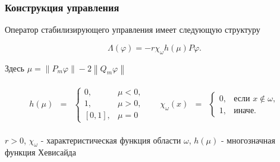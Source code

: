 \documentclass{beamer}
\newcommand{\norm}[1]{\left\lVert#1\right\rVert}
\begin{document}
\begin{frame}
    \frametitle{Конструкция управления}

    Оператор стабилизирующего управления имеет следующую структуру

    \begin{block}{}
        \begin{equation}
            \Lambda(\varphi) = -r \chi_{\omega}h(\mu)P\varphi.
        \end{equation}
    \end{block}

    Здесь $\mu = \norm{P_m\varphi} - 2 \norm{Q_m\varphi}$

    \begin{block}{}
        \begin{gather*}
            \begin{matrix}
                h(\mu) & =
                & \left\{
                \begin{matrix}
                    0, & \mu < 0, \\
                    1, & \mu > 0, \\
                    [0, 1], & \mu = 0
                \end{matrix} \right.
            \end{matrix} \quad
            \begin{matrix}
                \chi_{\omega}(x) & =
                & \left\{
                \begin{matrix}
                    0, & \mbox{если } x \notin \omega, \\
                    1, & \mbox{иначе. }
                \end{matrix} \right.
            \end{matrix}
        \end{gather*}
    \end{block}
    $r > 0$, $\chi_{\omega}$ - характеристическая функция области $\omega$,
    $h(\mu)$ - многозначная функция Хевисайда\\

\end{frame}
\end{document}
